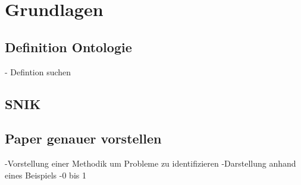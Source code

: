 \chapter{Grundlagen}
\label{ch:basics}
\section{Definition Ontologie}
- Defintion suchen
\section{SNIK}
\section{Paper genauer vorstellen}

-Vorstellung einer Methodik um Probleme zu identifizieren
-Darstellung anhand eines Beispiels
-0 bis 1 
